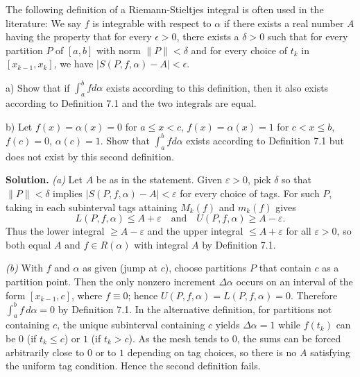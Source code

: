\begin{problembox}
The following definition of a Riemann-Stieltjes integral is often used in the literature: We say $f$ is integrable with respect to $\alpha$ if there exists a real number $A$ having the property that for every $\epsilon > 0$, there exists a $\delta > 0$ such that for every partition $P$ of $[a, b]$ with norm $\|P\| < \delta$ and for every choice of $t_k$ in $[x_{k-1}, x_k]$, we have $|S(P, f, \alpha) - A| < \epsilon$.

a) Show that if $\int_a^b f d\alpha$ exists according to this definition, then it also exists according to Definition 7.1 and the two integrals are equal.

b) Let $f(x) = \alpha(x) = 0$ for $a \leq x < c$, $f(x) = \alpha(x) = 1$ for $c < x \leq b$, $f(c) = 0$, $\alpha(c) = 1$. Show that $\int_a^b f d\alpha$ exists according to Definition 7.1 but does not exist by this second definition.
\end{problembox}

\noindent\textbf{Solution.}
\textit{(a)} Let $A$ be as in the statement. Given $\varepsilon>0$, pick $\delta$ so that $\|P\|<\delta$ implies $|S(P,f,\alpha)-A|<\varepsilon$ for every choice of tags. For such $P$, taking in each subinterval tags attaining $M_k(f)$ and $m_k(f)$ gives
\[L(P,f,\alpha)\le A+\varepsilon\quad\text{and}\quad U(P,f,\alpha)\ge A-\varepsilon.
\]
Thus the lower integral $\ge A-\varepsilon$ and the upper integral $\le A+\varepsilon$ for all $\varepsilon>0$, so both equal $A$ and $f\in R(\alpha)$ with integral $A$ by Definition 7.1.

\textit{(b)} With $f$ and $\alpha$ as given (jump at $c$), choose partitions $P$ that contain $c$ as a partition point. Then the only nonzero increment $\Delta\alpha$ occurs on an interval of the form $[x_{k-1},c]$, where $f\equiv 0$; hence $U(P,f,\alpha)=L(P,f,\alpha)=0$. Therefore $\int_a^b f\,d\alpha=0$ by Definition 7.1. In the alternative definition, for partitions not containing $c$, the unique subinterval containing $c$ yields $\Delta\alpha=1$ while $f(t_k)$ can be $0$ (if $t_k\le c$) or $1$ (if $t_k>c$). As the mesh tends to $0$, the sums can be forced arbitrarily close to $0$ or to $1$ depending on tag choices, so there is no $A$ satisfying the uniform tag condition. Hence the second definition fails.
\medskip

